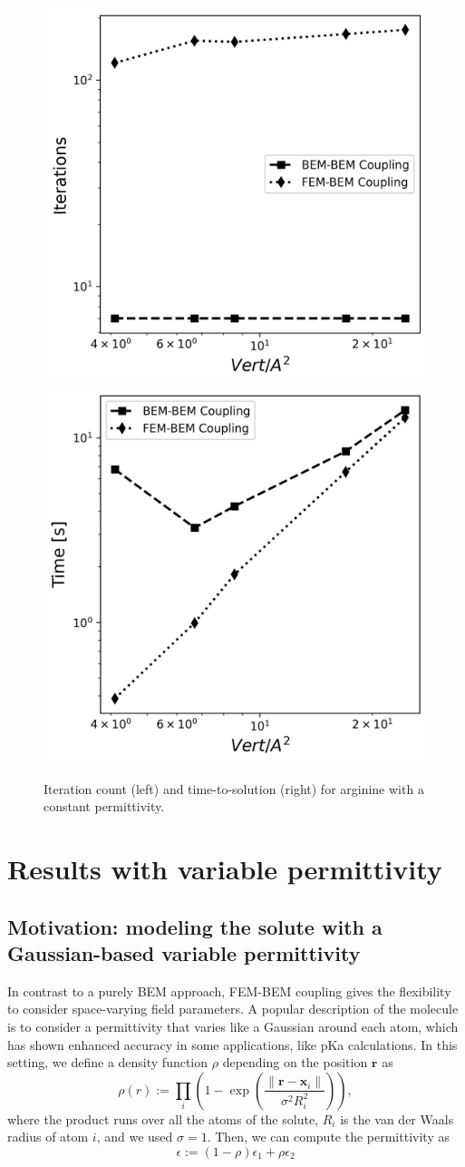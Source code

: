 \begin{figure}
\centering
   \includegraphics[width=0.45\linewidth]{DolfinX_Arginine2_const_coeff_iter.png}
  \includegraphics[width=0.45\linewidth]{DolfinX_Arginine2_const_coeff_total_time.png}
  \caption{Iteration count (left) and time-to-solution (right) for arginine with a constant permittivity.  }
\label{fig:arg2_constant_time_iter}
\end{figure}


\section*{\sffamily \Large Results with variable permittivity}

\subsection*{\sffamily \large Motivation: modeling the solute with a Gaussian-based variable permittivity}

In contrast to a purely BEM approach, FEM-BEM coupling gives the flexibility to consider space-varying field parameters. 
A popular description of the molecule is to consider a permittivity that varies like a Gaussian around each atom,\cite{grant2001smooth} which has shown enhanced accuracy in some applications, like pKa calculations.\cite{li2013dielectric}
In this setting, we define a density function $\rho$ depending on the position $\mathbf{r}$ as
%
\begin{equation}
\rho(r) := \prod_i \left(1 - \exp{\left(\frac{\|\mathbf{r}-\mathbf{x}_i\|}{\sigma^2 R_i^2}\right)}\right),
\end{equation}
%
where the product runs over all the atoms of the solute, $R_i$ is the van der Waals radius of atom $i$, and we used $\sigma=1$. Then, we can compute the permittivity as
%
\begin{equation}\label{eq:varying_eps}
\epsilon := \left(1-\rho \right) \epsilon_1 + \rho\epsilon_2
\end{equation}

